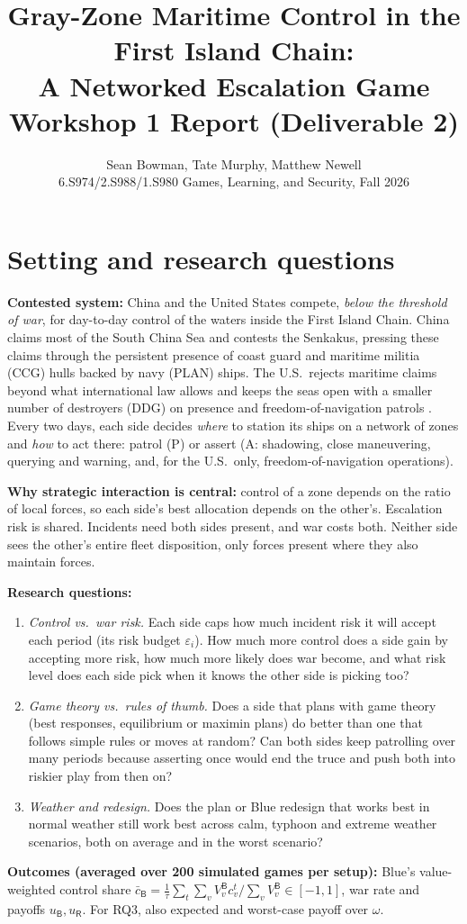 \documentclass[10pt]{article}
\title{\vspace{-3.2em}\textbf{Gray-Zone Maritime Control in the First Island Chain:\\ A Networked Escalation Game}\\[2pt]
\large Workshop 1 Report (Deliverable 2)}
\author{Sean Bowman, Tate Murphy, Matthew Newell\\
\small 6.S974/2.S988/1.S980 Games, Learning, and Security, Fall 2026}
\date{\vspace{-2.9em}}
\newcommand{\1}{\mathbf{1}}
\newcommand{\B}{\mathsf{B}}
\newcommand{\Rd}{\mathsf{R}}
\begin{document}
\maketitle

\section{Setting and research questions}
\textbf{Contested system:} China and the United States compete, \emph{below the threshold of war}, for day-to-day
control of the waters inside the First Island Chain. China claims most of the South China Sea and contests the
Senkakus, pressing these claims through the persistent presence of coast guard and maritime militia (CCG) hulls
backed by navy (PLAN) ships. The U.S.\ rejects maritime claims beyond what international law allows and keeps the
seas open with a smaller number of destroyers (DDG) on presence and freedom-of-navigation patrols
\citep{helmus2024,green2017}. Every two days, each side decides \emph{where} to station its ships on a network of
zones and \emph{how} to act there: patrol (P) or assert (A: shadowing, close maneuvering, querying and warning, and,
for the U.S.\ only, freedom-of-navigation operations).

\textbf{Why strategic interaction is central:}
control of a zone depends on the ratio of local forces, so each side's best allocation depends on the other's.
Escalation risk is shared. Incidents need both sides present, and war costs both. Neither side sees the other's
entire fleet disposition, only forces present where they also maintain forces.

\textbf{Research questions:}
\begin{enumerate}[label=\textbf{RQ\arabic*.}]
\item \emph{Control vs.\ war risk.} Each side caps how much incident risk it will accept each period (its risk
budget $\varepsilon_i$). How much more control does a side gain by accepting more risk, how much more likely does
war become, and what risk level does each side pick when it knows the other side is picking too?
\item \emph{Game theory vs.\ rules of thumb.} Does a side that plans with game theory (best responses,
equilibrium or maximin plans) do better than one that follows simple rules or moves at random? Can both sides
keep patrolling over many periods because asserting once would end the truce and push both into riskier play from
then on?
\item \emph{Weather and redesign.} Does the plan or Blue redesign that works best in normal weather still work
best across calm, typhoon and extreme weather scenarios, both on average and in the worst scenario?
\end{enumerate}
\textbf{Outcomes (averaged over 200 simulated games per setup):} Blue's value-weighted control share
$\bar c_\B=\frac1\tau\sum_t\sum_{v}V^\B_v c^t_v/\sum_v V^\B_v\in[-1,1]$, war rate and payoffs $u_\B,u_\Rd$. For RQ3,
also expected and worst-case payoff over $\omega$.
\end{document}
